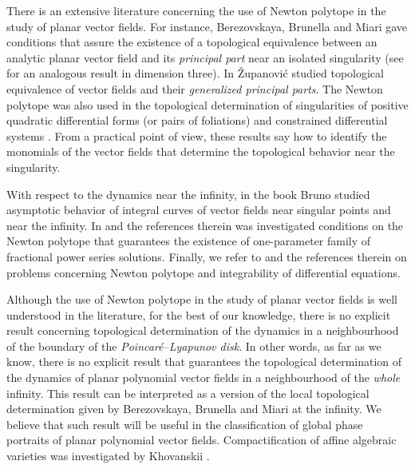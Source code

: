 \documentclass[12pt]{amsart}
\begin{document}
There is an extensive literature concerning the use of Newton polytope in the study of planar vector fields. For instance, Berezovskaya, Brunella and Miari \cite{Berezovskaya,BrunellaMiari} gave conditions that assure the existence of a topological equivalence between an analytic planar vector field and its \emph{principal part} near an isolated singularity (see \cite{AlonsoGonzalez} for an analogous result in dimension three). In \cite{Zupanovic2} Županović studied topological equivalence of vector fields and their \emph{generalized principal parts}. The Newton polytope was also used in the topological determination of singularities of positive quadratic differential forms (or pairs of foliations) \cite{GutierrezOliveiraTeixeira} and constrained differential systems \cite{PerezSilva2}. From a practical point of view, these results say how to identify the monomials of the vector fields that determine the topological behavior near the singularity.

With respect to the dynamics near the infinity, in the book \cite{Bruno} Bruno studied asymptotic behavior of integral curves of vector fields near singular points and near the infinity. In \cite{Cano} and the references therein was investigated conditions on the Newton polytope that guarantees the existence of one-parameter family of fractional power series solutions. Finally, we refer to \cite{DeminaGineValls} and the references therein on problems concerning Newton polytope and integrability of differential equations.

Although the use of Newton polytope in the study of  planar vector fields is well understood in the literature, for the best of our knowledge, there is no explicit result concerning topological determination of the dynamics in a neighbourhood of the boundary of the \emph{Poincaré--Lyapunov disk}. In other words, as far as we know, there is no explicit result that guarantees the topological determination of the dynamics of planar polynomial vector fields in a neighbourhood of the \emph{whole} infinity. This result can be interpreted as a version of the local topological determination given by Berezovskaya, Brunella and Miari at the infinity. We believe that such result will be useful in the classification of global phase portraits of planar polynomial vector fields.  Compactification of affine algebraic varieties was investigated by Khovanskii \cite{Khovanskii1,Khovanskii2}.
\end{document}
